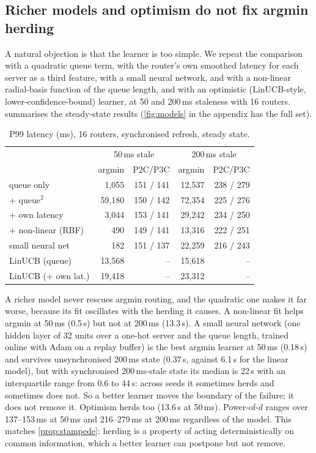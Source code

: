 \documentclass[10pt,twocolumn,letterpaper]{article}
\begin{document}
\subsection{Richer models and optimism do not fix argmin herding}
\label{sec:eval-models}
A natural objection is that the learner is too simple. We repeat the
comparison with a quadratic queue term, with the router's own smoothed latency
for each server as a third feature, with a small neural network, and with a non-linear radial-basis function of the queue length, and with an optimistic (LinUCB-style,
lower-confidence-bound) learner, at 50 and 200\,ms staleness with 16
routers.  summarises the steady-state results
(\cref{fig:models} in the appendix has the full set).
\begin{table}[t]
\centering
\small
\caption{P99 latency (ms), 16 routers, synchronised refresh, steady state.}
\label{tab:models}
\setlength{\tabcolsep}{3pt}
\begin{tabular}{lrrrr}
\toprule
 & \multicolumn{2}{c}{50\,ms stale} & \multicolumn{2}{c}{200\,ms stale}\\
 & argmin & P2C/P3C & argmin & P2C/P3C\\
\midrule
queue only            & 1{,}055 & 151 / 141 & 12{,}537 & 238 / 279\\
+ queue$^2$           & 59{,}180 & 150 / 142 & 72{,}354 & 225 / 276\\
+ own latency         & 3{,}044 & 153 / 141 & 29{,}242 & 234 / 250\\
+ non-linear (RBF)    & 490 & 149 / 141 & 13{,}316 & 222 / 251\\
small neural net      & 182 & 151 / 137 & 22{,}259 & 216 / 243\\
LinUCB (queue)        & 13{,}568 & -- & 15{,}618 & --\\
LinUCB (+ own lat.)& 19{,}418 & -- & 23{,}312 & --\\
\bottomrule
\end{tabular}
\end{table}
A richer model never rescues argmin routing, and the quadratic one makes it
far worse, because its fit oscillates with the herding it causes. A non-linear fit helps argmin at 50\,ms (0.5\,s) but not at 200\,ms (13.3\,s). A small neural network (one hidden layer of 32 units over a one-hot server and the queue length, trained online with Adam on a replay buffer) is the best argmin learner at 50\,ms (0.18\,s) and survives unsynchronised 200\,ms state (0.37\,s, against 6.1\,s for the linear model), but with synchronised 200\,ms-stale state its median is 22\,s with an interquartile range from 0.6 to 44\,s: across seeds it sometimes herds and sometimes does not. So a better learner moves the boundary of the failure; it does not remove it. Optimism
herds too (13.6\,s at 50\,ms). Power-of-$d$ ranges over 137--153\,ms at 50\,ms
and 216--279\,ms at 200\,ms regardless of the model. This matches
\cref{prop:stampede}: herding is a property of acting deterministically on
common information, which a better learner can postpone but not remove.
\end{document}
